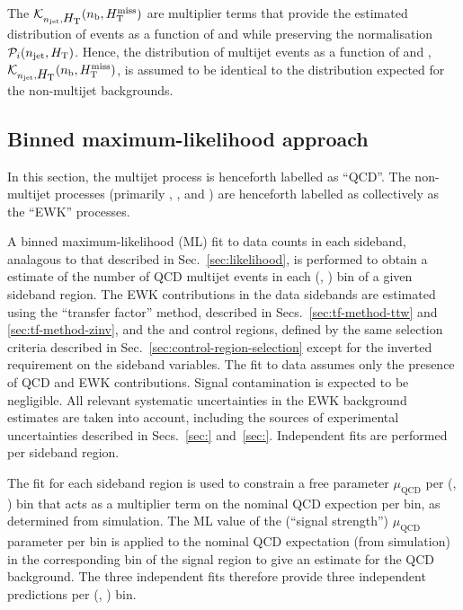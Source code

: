 The $\mathcal{K}_{n_{\text{jet}}, \mbox{$H_\text{T}$}}( n_{\text{b}}, \mbox{$H_{\rm T}^{\rm miss}$} )$ are multiplier
terms that provide the estimated distribution of events as a function
of \nb and \HTmiss while preserving the normalisation $\mathcal{P}_i(
n_{\text{jet}}, \mbox{$H_\text{T}$} )$. Hence, the distribution of multijet events as a
function of \nb and \HTmiss, $\mathcal{K}_{n_{\text{jet}}, \mbox{$H_\text{T}$}}( n_{\text{b}},
\mbox{$H_{\rm T}^{\rm miss}$} )$, is assumed to be identical to the distribution expected
for the non-multijet backgrounds.

\subsection{Binned maximum-likelihood approach}

In this section, the multijet process is henceforth labelled as
``QCD''. The non-multijet processes (primarily \wj, \ttbar, and
\znunu) are henceforth labelled as collectively as the ``EWK''
processes.

A binned maximum-likelihood (ML) fit to data counts in each sideband,
analagous to that described in Sec.~\ref{sec:likelihood}, is performed
to obtain a estimate of the number of QCD multijet events in each
(\njet, \scalht) bin of a given sideband region. The EWK contributions
in the data sidebands are estimated using the ``transfer factor''
method, described in Secs.~\ref{sec:tf-method-ttw} and
\ref{sec:tf-method-zinv}, and the \mj and \mmj control regions,
defined by the same selection criteria described in
Sec.~\ref{sec:control-region-selection} except for the inverted
requirement on the sideband variables. The fit to data assumes only
the presence of QCD and EWK contributions. Signal contamination is
expected to be negligible. All relevant systematic uncertainties in
the EWK background estimates are taken into account, including the
sources of experimental uncertainties described in Secs.~\ref{sec:}
and~\ref{sec:}. Independent fits are performed per sideband region.

The fit for each sideband region is used to constrain a free parameter
$\mu_{\textrm{QCD}}$ per (\njet, \scalht) bin that acts as a
multiplier term on the nominal QCD expection per bin, as determined
from simulation. The ML value of the (``signal strength'')
$\mu_{\textrm{QCD}}$ parameter per bin is applied to the nominal QCD
expectation (from simulation) in the corresponding bin of the signal
region to give an estimate for the QCD background. The three
independent fits therefore provide three independent predictions per
(\njet, \scalht) bin.

